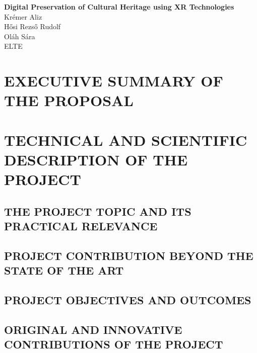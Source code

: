 \documentclass[11pt]{article}
\begin{document}
\setcounter{section}{-1} 

\begin{center}
    {\LARGE \textbf{Digital Preservation of Cultural Heritage using XR Technologies}}\\[1cm]

    {\large
    Krémer Aliz\\
    Hősi Rezső Rudolf\\
    Oláh Sára\\[1em]
    ELTE
    }
\end{center}

\vspace{1em}

\renewcommand{\contentsname}{Table of Contents} %
\tableofcontents
\newpage

\section{EXECUTIVE SUMMARY OF THE PROPOSAL} 


\section{TECHNICAL AND SCIENTIFIC DESCRIPTION OF THE PROJECT} 

\subsection{THE PROJECT TOPIC AND ITS PRACTICAL RELEVANCE} 


\subsection{PROJECT CONTRIBUTION BEYOND THE STATE OF THE ART} 


\subsection{PROJECT OBJECTIVES AND OUTCOMES} 


\subsection{ORIGINAL AND INNOVATIVE CONTRIBUTIONS OF THE PROJECT} 

\end{document}
